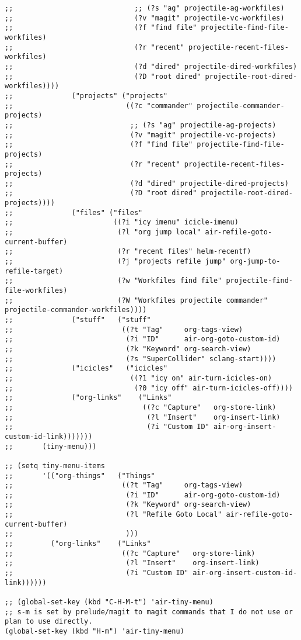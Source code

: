 \documentclass[11pt]{article}
\begin{document}
\begin{verbatim}
;;                             ;; (?s "ag" projectile-ag-workfiles)
;;                             (?v "magit" projectile-vc-workfiles)
;;                             (?f "find file" projectile-find-file-workfiles)
;;                             (?r "recent" projectile-recent-files-workfiles)
;;                             (?d "dired" projectile-dired-workfiles)
;;                             (?D "root dired" projectile-root-dired-workfiles))))
;;              ("projects" ("projects"
;;                           ((?c "commander" projectile-commander-projects)
;;                            ;; (?s "ag" projectile-ag-projects)
;;                            (?v "magit" projectile-vc-projects)
;;                            (?f "find file" projectile-find-file-projects)
;;                            (?r "recent" projectile-recent-files-projects)
;;                            (?d "dired" projectile-dired-projects)
;;                            (?D "root dired" projectile-root-dired-projects))))
;;              ("files" ("files"
;;                        ((?i "icy imenu" icicle-imenu)
;;                         (?l "org jump local" air-refile-goto-current-buffer)
;;                         (?r "recent files" helm-recentf)
;;                         (?j "projects refile jump" org-jump-to-refile-target)
;;                         (?w "Workfiles find file" projectile-find-file-workfiles)
;;                         (?W "Workfiles projectile commander" projectile-commander-workfiles))))
;;              ("stuff"   ("stuff"
;;                          ((?t "Tag"     org-tags-view)
;;                           (?i "ID"      air-org-goto-custom-id)
;;                           (?k "Keyword" org-search-view)
;;                           (?s "SuperCollider" sclang-start))))
;;              ("icicles"   ("icicles"
;;                            ((?1 "icy on" air-turn-icicles-on)
;;                             (?0 "icy off" air-turn-icicles-off))))
;;              ("org-links"    ("Links"
;;                               ((?c "Capture"   org-store-link)
;;                                (?l "Insert"    org-insert-link)
;;                                (?i "Custom ID" air-org-insert-custom-id-link)))))))
;;       (tiny-menu)))

;; (setq tiny-menu-items
;;       '(("org-things"   ("Things"
;;                          ((?t "Tag"     org-tags-view)
;;                           (?i "ID"      air-org-goto-custom-id)
;;                           (?k "Keyword" org-search-view)
;;                           (?l "Refile Goto Local" air-refile-goto-current-buffer)
;;                           )))
;;         ("org-links"    ("Links"
;;                          ((?c "Capture"   org-store-link)
;;                           (?l "Insert"    org-insert-link)
;;                           (?i "Custom ID" air-org-insert-custom-id-link))))))

;; (global-set-key (kbd "C-H-M-t") 'air-tiny-menu)
;; s-m is set by prelude/magit to magit commands that I do not use or plan to use directly.
(global-set-key (kbd "H-m") 'air-tiny-menu)
\end{verbatim}
\end{document}
